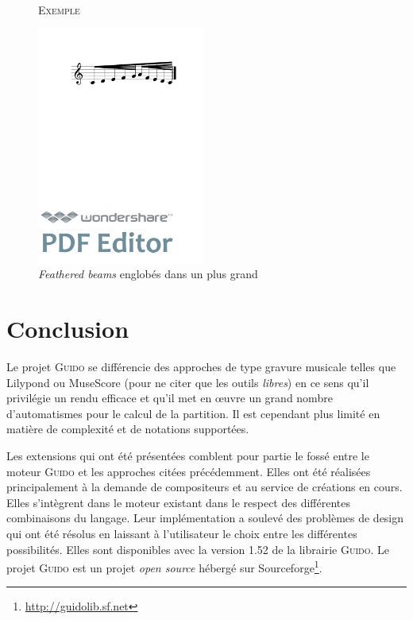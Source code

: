 \documentclass{article}
\newenvironment{gmncode}	{\vspace{-2mm}\small\verbatim}{\endverbatim\vspace{-2mm}}
\newcommand{\guido}			{\textsc{Guido}}
\newcommand{\exemple}		{\vspace{2mm}\hspace*{-3mm}\textsc{Exemple}}
\begin{document}
\begin{figure}[h]
\exemple
\begin{gmncode}
[ 
  \beam( 
    \fBeam(c/8 e d f g/32) 
    \fBeam(a/16 f e d c/64) 
  ) 
]
\end{gmncode}

\begin{center}
\includegraphics[width=55mm]{img/fBeamHierarchie.pdf}
\end{center}
\caption{\emph{Feathered beams} englobés dans un plus grand}
\label{fig:fbeamhierarchie}
\end{figure}



\section{Conclusion}\label{sec:conclusion}
Le projet \guido{} se différencie des approches de type gravure musicale telles que Lilypond ou MuseScore (pour ne citer que les outils \emph{libres}) en ce sens qu'il privilégie un rendu efficace et qu'il met en \oe{}uvre un grand nombre d'automatismes pour le calcul de la partition. Il est cependant plus limité en matière de complexité et de notations supportées. 

Les extensions qui ont été présentées comblent pour partie le fossé entre le moteur \guido{} et les approches citées précédemment. Elles ont été réalisées principalement à la demande de compositeurs et au service de créations en cours. Elles s'intègrent dans le moteur existant dans le respect des différentes combinaisons du langage. Leur implémentation a soulevé des problèmes de design qui ont été résolus en laissant à l'utilisateur le choix entre les différentes possibilités. Elles sont disponibles avec la version 1.52 de la librairie \guido{}. Le projet \guido{} est un projet \emph{open source} hébergé sur Sourceforge\footnote{\url{http://guidolib.sf.net}}.



\balance


\end{document}
